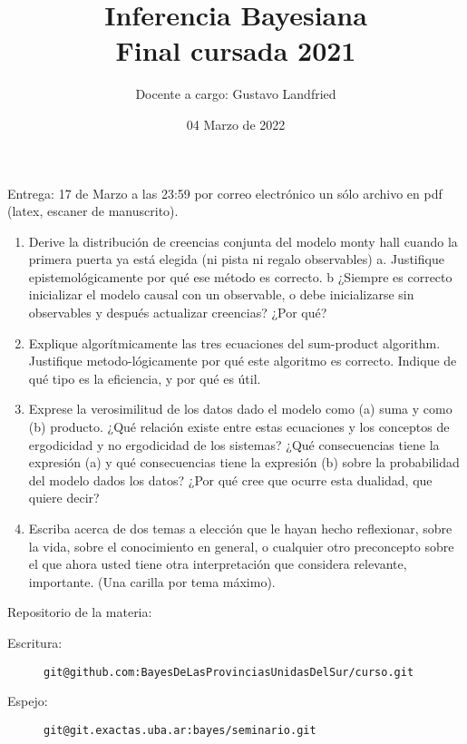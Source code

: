 \documentclass[10pt]{article}
\title{\LARGE Inferencia Bayesiana \\ \Large  Final cursada 2021 }
\author{Docente a cargo: Gustavo Landfried}
\affil{Facultad de Ciencias Exactas y Naturales. Universidad de Buenos Aires.}
\affil[]{Mail: \texttt{bayesdelsur@gmail.com}}
\date{04 Marzo de 2022}
\begin{document}
\maketitle

Entrega: 17 de Marzo a las 23:59 por correo electrónico un sólo archivo en pdf (latex, escaner de manuscrito).

\begin{enumerate}

\item Derive la distribución de creencias conjunta del modelo monty hall cuando la primera puerta ya está elegida (ni pista ni regalo observables) a. Justifique epistemológicamente por qué ese método es correcto. b ¿Siempre es correcto inicializar el modelo causal con un observable, o debe inicializarse sin observables y después actualizar creencias? ¿Por qué?

\item Explique algorítmicamente las tres ecuaciones del sum-product algorithm. Justifique metodo-lógicamente por qué este algoritmo es correcto. Indique de qué tipo es la eficiencia, y por qué es útil. 

\item Exprese la verosimilitud de los datos dado el modelo como (a) suma y como (b) producto. ¿Qué relación existe entre estas ecuaciones y los conceptos de ergodicidad y no ergodicidad de los sistemas? ¿Qué consecuencias tiene la expresión (a) y qué consecuencias tiene la expresión (b) sobre la probabilidad del modelo dados los datos? ¿Por qué cree que ocurre esta dualidad, que quiere decir?


\item Escriba acerca de dos temas a elección que le hayan hecho reflexionar, sobre la vida, sobre el conocimiento en general, o cualquier otro preconcepto sobre el que ahora usted tiene otra interpretación que considera relevante, importante. (Una carilla por tema máximo).

\end{enumerate}

\vspace{1cm}

Repositorio de la materia:\\[-.6cm]
\begin{description}
\item[Escritura:] \texttt{git@github.com:BayesDeLasProvinciasUnidasDelSur/curso.git} \\[-0.6cm]
\item[Espejo:] \texttt{git@git.exactas.uba.ar:bayes/seminario.git}
\end{description}
\end{document}
